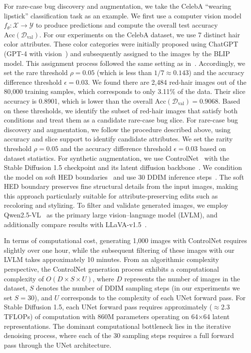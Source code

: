\documentclass[10pt]{article} %
\newcommand{\controlnet}{ControlNet\xspace}
\newcommand{\qwen}{Qwen2.5-VL\xspace}
\newcommand{\llava}{LLaVA-v1.5\xspace}
\begin{document}
For rare-case bug discovery and augmentation, we take the CelebA “wearing lipstick” classification task as an example. We first use a computer vision model \(f_\theta\colon \mathcal{X}\to\mathcal{Y}\) to produce predictions and compute the overall test accuracy \(\mathrm{Acc}(\mathcal{D}_{\mathrm{val}})\). 
For our experiments on the CelebA dataset, we use 7 distinct hair color attributes. These color categories were initially proposed using ChatGPT (GPT-4 with vision~\citep{openai2023gpt4}) and subsequently assigned to the images by the BLIP~\citep{li2022blip} model. This assignment process followed the same setting as in~\citep{chen2023hibug}. Accordingly, we set the rare threshold \(\rho = 0.05\) (which is less than \(1/7 \approx 0.143\)) and the accuracy difference threshold \(\epsilon = 0.03\). We found there are 2{,}484 red-hair images out of the 80{,}000 training samples, which corresponds to only 3.11\% of the data. Their slice accuracy is 0.8901, which is lower than the overall \(\mathrm{Acc}(\mathcal{D}_{\mathrm{val}}) = 0.9068\). Based on these thresholds, we identify the subset of red-hair images that satisfy both conditions and treat them as a candidate rare-case bug slice.
For rare-case bug discovery and augmentation, we follow the procedure described above, using accuracy and slice support to identify candidate attributes. We set the rarity threshold \(\rho = 0.05\) and the accuracy difference threshold \(\epsilon = 0.03\) based on dataset statistics. For synthetic augmentation, we use \controlnet~\citep{zhang2023adding} with the Stable Diffusion 1.5 checkpoint and its latent diffusion backbone~\citep{rombach2022high}. We condition the model on soft HED boundaries~\citep{xie2015holistically} and use 30 DDIM inference steps~\citep{song2021ddim}. The soft HED boundary preserves fine structural details from the input images, making this approach particularly suitable for attribute-preserving edits such as recoloring and stylizing. To filter and validate generated images, we employ \qwen~\citep{bai2025qwen25vl} as the primary large vision--language model (LVLM), and additionally compare results with \llava~\citep{liu2023improvedllava}.

In terms of computational cost, generating 1,000 images with ControlNet requires slightly over one hour, while the subsequent filtering of these images with our LVLM takes approximately 10 minutes. From an algorithmic complexity perspective, the ControlNet generation process exhibits a computational complexity of $O(D \times S \times U)$, where $D$ represents the number of images in the dataset, $S$ denotes the number of DDIM sampling steps (in our experiments we set $S=30$), and $U$ corresponds to the complexity of each UNet forward pass. For Stable Diffusion 1.5, each UNet forward pass requires approximately (\(\approx\)2.3 TFLOPs) of computation with 860M parameters operating on 64×64 latent representations. The dominant computational bottleneck lies in the iterative denoising process, where each of the 30 sampling steps requires a full forward pass through the UNet architecture. 
\end{document}
